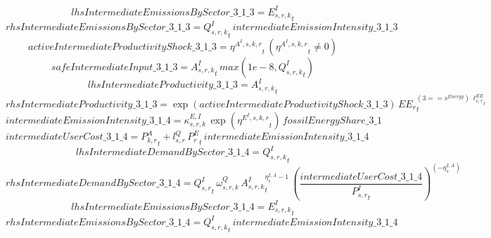 \begin{dmath*}
lhsIntermediateEmissionsBySector\_3\_1\_3 = {{E^I_{s,r,k}}}_{t}
\end{dmath*}
\begin{dmath*}
rhsIntermediateEmissionsBySector\_3\_1\_3 = {{Q^{I}_{s,r,k}}}_{t}\, {intermediateEmissionIntensity\_3\_1\_3}
\end{dmath*}
\begin{dmath*}
activeIntermediateProductivityShock\_3\_1\_3 = {{\eta^{A^{I},s,k,r}}}_{t}\, \left({{\eta^{A^{I},s,k,r}}}_{t}\neq 0\right)
\end{dmath*}
\begin{dmath*}
safeIntermediateInput\_3\_1\_3 = {{A^{I}_{s,r,k}}}_{t}\, max(1e-8,{{Q^{I}_{s,r,k}}}_{t})
\end{dmath*}
\begin{dmath*}
lhsIntermediateProductivity\_3\_1\_3 = {{A^{I}_{s,r,k}}}_{t}
\end{dmath*}
\begin{dmath*}
rhsIntermediateProductivity\_3\_1\_3 = \exp\left({activeIntermediateProductivityShock\_3\_1\_3}\right)\, {{EE_r}}_{t}^{\left(3=={{s^{Energy}}}\right)\, {{\ell^{EE}_{s,r}}}_{t}}
\end{dmath*}
\begin{dmath*}
intermediateEmissionIntensity\_3\_1\_4 = {{\kappa^{E,I}_{s,r,k}}}\, \exp\left({{\eta^{E^{I},s,k,r}}}_{t}\right)\, {fossilEnergyShare\_3\_1}
\end{dmath*}
\begin{dmath*}
intermediateUserCost\_3\_1\_4 = {{P^{A}_{k,r}}}_{t}+{{l^{Q}_{s,r}}}\, {{P^E_r}}_{t}\, {intermediateEmissionIntensity\_3\_1\_4}
\end{dmath*}
\begin{dmath*}
lhsIntermediateDemandBySector\_3\_1\_4 = {{Q^{I}_{s,r,k}}}_{t}
\end{dmath*}
\begin{dmath*}
rhsIntermediateDemandBySector\_3\_1\_4 = {{Q^{I}_{s,r}}}_{t}\, {{\omega^{Q}_{s,r,k}}}\, {{A^{I}_{s,r,k}}}_{t}^{{{\eta^{I,A}_{s}}}-1}\, \left(\frac{{intermediateUserCost\_3\_1\_4}}{{{P^{I}_{s,r}}}_{t}}\right)^{\left(-{{\eta^{I,A}_{s}}}\right)}
\end{dmath*}
\begin{dmath*}
lhsIntermediateEmissionsBySector\_3\_1\_4 = {{E^I_{s,r,k}}}_{t}
\end{dmath*}
\begin{dmath*}
rhsIntermediateEmissionsBySector\_3\_1\_4 = {{Q^{I}_{s,r,k}}}_{t}\, {intermediateEmissionIntensity\_3\_1\_4}
\end{dmath*}
